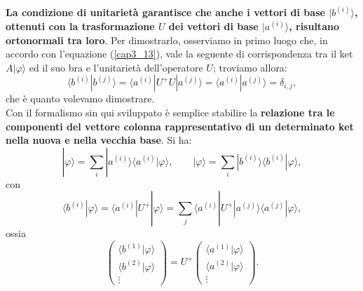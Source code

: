 \documentclass[a4paper,12pt,oneside]{book}
\begin{document}
\textbf{La condizione di unitarietà garantisce che anche i vettori di base $| b^{(i)} \rangle $, ottenuti con la trasformazione $U$ dei vettori di base $| a^{(i)} \rangle $, risultano ortonormali tra loro}. Per dimostrarlo, osserviamo in primo luogo che, in accordo con l'equazione (\ref{cap3_13}), vale la seguente di corrispondenza tra il ket $A | \varphi \rangle $ ed il suo bra e l'unitarietà dell'operatore $U$; troviamo allora:
	\begin{equation}
	\langle b^{(i)} | b^{(j)} \rangle = \langle a^{(i)} | U^{+}U | a^{(j)} \rangle = \langle a^{(i)} |  a^{(j)} \rangle = \delta_{i,j} ,
	\end{equation}
che è quanto volevamo dimostrare.\\

Con il formalismo sin qui sviluppato è semplice stabilire la \textbf{relazione tra le componenti del vettore colonna rappresentativo di un determinato ket nella nuova e nella vecchia base}. Si ha:
	\begin{equation}
		\boxed{
			| \varphi \rangle = \sum \limits_{i}  | a^{(i)} \rangle \langle a^{(i)} | \varphi  \rangle , \qquad
			| \varphi \rangle = \sum \limits_{i}  | b^{(i)} \rangle \langle b^{(i)} | \varphi \rangle ,
			}
	\end{equation}
con
	\begin{equation}
		\boxed{
			\langle b^{(i)} | \varphi \rangle = \langle a^{(i)} |  U^+ | \varphi \rangle = \sum \limits_{j} \langle a^{(i)} | U^+ | a^{(j)}\rangle \langle a^{(j)} | \varphi \rangle ,
			}
	\end{equation}
ossia
	\begin{equation}
		\boxed{
			\begin{pmatrix}
			\langle b^{(1)} | \varphi \rangle \\
			\langle b^{(2)} | \varphi \rangle \\
			\vdots 
			\end{pmatrix} = U^+
			\begin{pmatrix}
			\langle a^{(1)} | \varphi \rangle \\
			\langle a^{(2)} | \varphi \rangle \\
			\vdots 
			\end{pmatrix} .
			}
	\end{equation}
\end{document}

